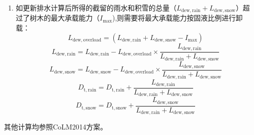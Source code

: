 \begin{enumerate}
  \item 如更新排水计算后所得的截留的雨水和积雪的总量（$L_{\mathrm{dew,rain}}+L_{\mathrm{dew,snow}}$）超过了树木的最大承载能力（$I_{\mathrm{max}}$),则需要将最大承载能力按固液比例进行卸载：
  \begin{equation}
    L_{\mathrm{dew,overload}}=(L_{\mathrm{dew,rain}}+L_{\mathrm{dew,snow}}-I_{\mathrm{max}})
  \end{equation}
  \begin{equation}
    L_{\mathrm{dew,rain}}=L_{\mathrm{dew,rain}} - L_{\mathrm{dew,overload}} \times \frac{L_{\mathrm{dew,rain}}}{L_{\mathrm{dew,rain}}+L_{\mathrm{dew,snow}}}
  \end{equation}
  \begin{equation}
    L_{\mathrm{dew,snow}}=L_{\mathrm{dew,snow}} - L_{\mathrm{dew,overload}} \times   \frac{L_{\mathrm{dew,snow}}}{L_{\mathrm{dew,rain}}+L_{\mathrm{dew,snow}}}
  \end{equation}
  \begin{equation}
    D_{\mathrm {t,rain}}=D_{\mathrm {t,rain}} + \frac{L_{\mathrm{dew,rain}}}{L_{\mathrm{dew,rain}}+L_{\mathrm{dew,snow}}}
  \end{equation}
  \begin{equation}
    D_{\mathrm {t,snow}}=D_{\mathrm {t,snow}} + \frac{L_{\mathrm{dew,snow}}}{L_{\mathrm{dew,rain}}+L_{\mathrm{dew,snow}}}
  \end{equation}
\end{enumerate}
其他计算均参照CoLM2014方案。



